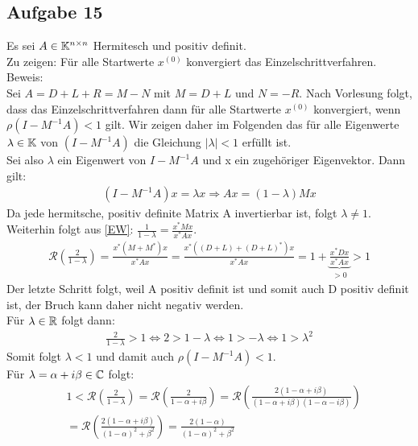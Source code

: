 \subsection*{Aufgabe 15}
Es sei $A \in \mathbb K^{n\times n}$ Hermitesch und positiv definit.\\
Zu zeigen: Für alle Startwerte $x^{(0)}$ konvergiert das Einzelschrittverfahren.\\
\newline
Beweis:\\
Sei $A=D+L+R=M-N$ mit $M=D+L$ und $N=-R$.
Nach Vorlesung folgt, dass das Einzelschrittverfahren dann für alle Startwerte $x^{(0)}$ konvergiert, wenn $\rho(I-M^{-1}A)<1$ gilt. Wir zeigen daher im Folgenden das für alle Eigenwerte $\lambda \in \mathbb K$ von $(I-M^{-1}A)$ die Gleichung $|\lambda|<1$ erfüllt ist.\\
\newline
Sei also $\lambda$ ein Eigenwert von $I-M^{-1}A$ und x ein zugehöriger Eigenvektor. Dann gilt:
\begin{align}\label{EW}
(I-M^{-1}A)x=\lambda x \Rightarrow Ax=(1-\lambda)Mx
\end{align}
Da jede hermitsche, positiv definite Matrix A invertierbar ist, folgt $\lambda \neq 1$.\\
Weiterhin folgt aus \eqref{EW}: $\frac{1}{1-\lambda}=\frac{x^*Mx}{x^*Ax}$.
\begin{align}
\mathcal{R}\left(\frac{2}{1-\lambda}\right)=\frac{x^*(M+M^*)x}{x^*Ax}=\frac{x^*((D+L)+(D+L)^*)x}{x^*Ax}=1+\underbrace{\frac{x^*Dx}{x^*Ax}}_{>0}>1
\end{align}
Der letzte Schritt folgt, weil A positiv definit ist und somit auch D positiv definit ist, der Bruch kann daher nicht negativ werden.\\
\newline
Für $\lambda \in \mathbb R$ folgt dann:
\begin{align*}
\frac{2}{1-\lambda}>1\Leftrightarrow  2>1-\lambda
\Leftrightarrow 1>-\lambda \Leftrightarrow 1>\lambda^2
\end{align*}
Somit folgt $\lambda<1$ und damit auch $\rho(I-M^{-1}A)<1$.\\
\newline
Für $\lambda=\alpha +i\beta \in \mathbb C$ folgt:
\begin{align*}
&1<\mathcal{R}\left(\frac{2}{1-\lambda}\right)=\mathcal{R}\left(\frac{2}{1-\alpha+ i \beta}\right)=\mathcal{R}\left(\frac{2(1-\alpha+i \beta)}{(1-\alpha+ i \beta)(1-\alpha- i \beta)}\right)\\&=\mathcal{R}\left(\frac{2(1-\alpha+i \beta)}{(1-\alpha)^2+\beta^2}\right)=\frac{2(1-\alpha)}{(1-\alpha)^2+\beta^2}
\end{align*}
